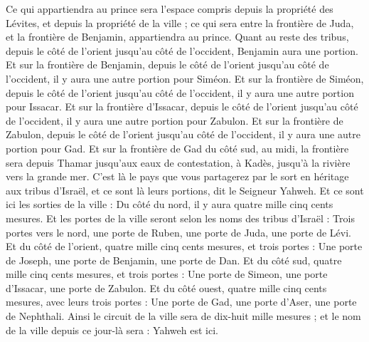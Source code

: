 \begin{multicols}{2}
Ce qui appartiendra au prince sera l’espace compris depuis la propriété des Lévites, et depuis la propriété de la ville ; ce qui sera entre la frontière de Juda, et la frontière de Benjamin, appartiendra au prince.
Quant au reste des tribus, depuis le côté de l’orient jusqu'au côté de l’occident, Benjamin aura une portion.
Et sur la frontière de Benjamin, depuis le côté de l’orient jusqu'au côté de l’occident, il y aura une autre portion pour Siméon.
Et sur la frontière de Siméon, depuis le côté de l’orient jusqu'au côté de l’occident, il y aura une autre portion pour Issacar.
Et sur la frontière d’Issacar, depuis le côté de l’orient jusqu'au côté de l’occident, il y aura une autre portion pour Zabulon.
Et sur la frontière de Zabulon, depuis le côté de l’orient jusqu'au côté de l’occident, il y aura une autre portion pour Gad.
Et sur la frontière de Gad du côté sud, au midi, la frontière sera depuis Thamar jusqu'aux eaux de contestation, à Kadès, jusqu'à la rivière vers la grande mer.
C'est là le pays que vous partagerez par le sort en héritage aux tribus d'Israël, et ce sont là leurs portions, dit le Seigneur Yahweh.
Et ce sont ici les sorties de la ville : Du côté du nord, il y aura quatre mille cinq cents mesures.
Et les portes de la ville seront selon les noms des tribus d'Israël : Trois portes vers le nord, une porte de Ruben, une porte de Juda, une porte de Lévi.
Et du côté de l’orient, quatre mille cinq cents mesures, et trois portes : Une porte de Joseph, une porte de Benjamin, une porte de Dan.
Et du côté sud, quatre mille cinq cents mesures, et trois portes : Une porte de Simeon, une porte d'Issacar, une porte de Zabulon.
Et du côté ouest, quatre mille cinq cents mesures, avec leurs trois portes : Une porte de Gad, une porte d'Aser, une porte de Nephthali.
Ainsi le circuit de la ville sera de dix-huit mille mesures ; et le nom de la ville depuis ce jour-là sera : Yahweh est ici.
\PPE{}
\end{multicols}
